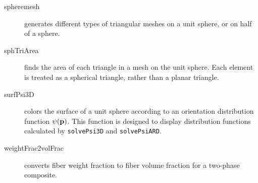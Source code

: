 \documentclass[11pt]{article}
\begin{document}
\begin{description}
    \item[spheremesh]{generates different types of triangular meshes on a unit sphere, or on half of a sphere.}

    \item[sphTriArea]{finds the area of each triangle in a mesh on the unit sphere.  Each element is treated as a spherical triangle, rather than a planar triangle.}

    \item[surfPsi3D]{colors the surface of a unit sphere according to an orientation distribution function $\psi (\mathbf{p})$.  This function is designed to display distribution functions calculated by \texttt{solvePsi3D} and \texttt{solvePsiARD}.}

    \item[weightFrac2volFrac]{converts fiber weight fraction to fiber volume fraction for a two-phase composite.}
    
    
\end{description}
\end{document}
